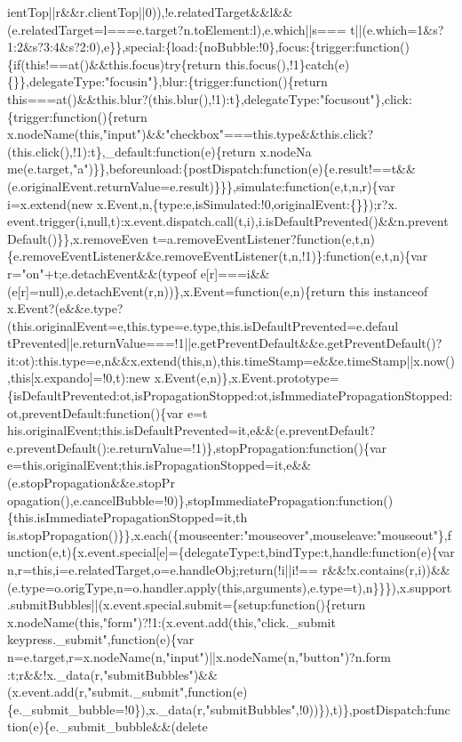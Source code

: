 \begin{DoxyCode}
{      ientTop||r&&r.clientTop||0)),!e.relatedTarget&&l&&(e.relatedTarget=l===e.target?n.toElement:l),e.which||s===
      t||(e.which=1&s?1:2&s?3:4&s?2:0),e\}\},special:\{load:\{noBubble:!0\},focus:\{trigger:function()\{if(this!==at()&&this.focus)try\{return this.focus(),!1\}catch(e)\{\}\},delegateType:"focusin"\},blur:\{trigger:function()\{return
       this===at()&&this.blur?(this.blur(),!1):t\},delegateType:"focusout"\},click:\{trigger:function()\{return
       x.nodeName(this,"input")&&"checkbox"===this.type&&this.click?(this.click(),!1):t\},\_default:function(e)\{return
       x.nodeNa
      me(e.target,"a")\}\},beforeunload:\{postDispatch:function(e)\{e.result!==t&&(e.originalEvent.returnValue=e.result)\}\}\},simulate:function(e,t,n,r)\{var i=x.extend(new
       x.Event,n,\{type:e,isSimulated:!0,originalEvent:\{\}\});r?x.
      event.trigger(i,null,t):x.event.dispatch.call(t,i),i.isDefaultPrevented()&&n.preventDefault()\}\},x.removeEven
      t=a.removeEventListener?function(e,t,n)\{e.removeEventListener&&e.removeEventListener(t,n,!1)\}:function(e,t,n)\{var r="on"+t;e.detachEvent&&(typeof
       e[r]===i&&(e[r]=null),e.detachEvent(r,n))\},x.Event=function(e,n)\{return this instanceof
       x.Event?(e&&e.type?(this.originalEvent=e,this.type=e.type,this.isDefaultPrevented=e.defaul
      tPrevented||e.returnValue===!1||e.getPreventDefault&&e.getPreventDefault()?it:ot):this.type=e,n&&x.extend(this,n),this.timeStamp=e&&e.timeStamp||x.now(),this[x.expando]=!0,t):new
       x.Event(e,n)\},x.Event.prototype=\{isDefaultPrevented:ot,isPropagationStopped:ot,isImmediatePropagationStopped:ot,preventDefault:function()\{var
       e=t
      his.originalEvent;this.isDefaultPrevented=it,e&&(e.preventDefault?e.preventDefault():e.returnValue=!1)\},stopPropagation:function()\{var
       e=this.originalEvent;this.isPropagationStopped=it,e&&(e.stopPropagation&&e.stopPr
      opagation(),e.cancelBubble=!0)\},stopImmediatePropagation:function()\{this.isImmediatePropagationStopped=it,th
      is.stopPropagation()\}\},x.each(\{mouseenter:"mouseover",mouseleave:"mouseout"\},function(e,t)\{x.event.special[e]=\{delegateType:t,bindType:t,handle:function(e)\{var
       n,r=this,i=e.relatedTarget,o=e.handleObj;return(!i||i!==
      r&&!x.contains(r,i))&&(e.type=o.origType,n=o.handler.apply(this,arguments),e.type=t),n\}\}\}),x.support.submitBubbles||(x.event.special.submit=\{setup:function()\{return
       x.nodeName(this,"form")?!1:(x.event.add(this,"click.\_submit keypress.\_submit",function(e)\{var
       n=e.target,r=x.nodeName(n,"input")||x.nodeName(n,"button")?n.form
      :t;r&&!x.\_data(r,"submitBubbles")&&(x.event.add(r,"submit.\_submit",function(e)\{e.\_submit\_bubble=!0\}),x.\_data(r,"submitBubbles",!0))\}),t)\},postDispatch:function(e)\{e.\_submit\_bubble&&(delete
}
\end{DoxyCode}

